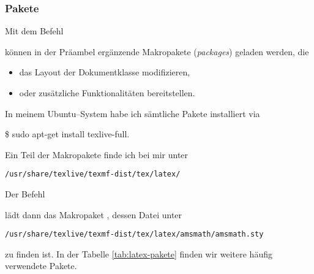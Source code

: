 \subsubsection{Pakete}
Mit dem Befehl
\begin{center}
\end{center}
können in der Präambel ergänzende Makropakete (\textit{packages}) geladen werden, die 
\begin{itemize}
	\item das Layout der Dokumentklasse modifizieren,
	\item oder zusätzliche Funktionalitäten bereitstellen.
\end{itemize}
In meinem Ubuntu--System habe ich sämtliche Pakete installiert via
\begin{center}
	\$ sudo apt-get install texlive-full.
\end{center} 
Ein Teil der Makropakete finde ich bei mir unter
\begin{center}
	\texttt{/usr/share/texlive/texmf-dist/tex/latex/}
\end{center}
Der Befehl
\begin{center}
\end{center}
lädt dann das Makropaket , dessen  Datei unter
\begin{center}
	\texttt{/usr/share/texlive/texmf-dist/tex/latex/amsmath/amsmath.sty}
\end{center}
zu finden ist. In der Tabelle \ref{tab:latex-pakete} finden wir weitere häufig verwendete Pakete.
~\\~\\
